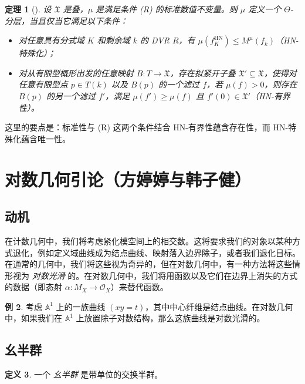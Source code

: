 \documentclass{amsart}
\newtheorem{thm}{定理}[section]
\theoremstyle{definition}
\newtheorem{defn}[thm]{定义}
\newtheorem{exm}[thm]{例}
\theoremstyle{remark}
\theoremstyle{plain}
\theoremstyle{definition}
\theoremstyle{remark}
\newcommand{\A}{\mathbb{A}}
\newcommand{\mc}[1]{\mathcal{#1}}
\newcommand{\mf}[1]{\mathfrak{#1}}
\newcommand{\mr}[1]{\mathrm{#1}}
\newcommand{\1}{\mathbf{1}}
\newcommand{\2}{\mathbf{2}}
\newcommand{\3}{\mathbf{3}}
\begin{document}
\begin{thm}[{\cite{HLinstability}}]
    设 \(\mf{X}\) 是叠，\(\mu\) 是满足条件 (R) 的标准数值不变量。则 \(\mu\) 定义一个 \(\Theta\)-分层，当且仅当它满足以下条件：
    \begin{itemize}
        \item 对任意具有分式域 \(K\) 和剩余域 \(k\) 的 DVR \(R\)，有 \(\mu(f_K^{\mr{HN}}) \leq M^{\mu}(f_k)\)（HN-特殊化）；
        \item 对从有限型概形出发的任意映射 \(B \colon T \to \mf{X}\)，存在拟紧开子叠 \(\mf{X}' \subseteq \mf{X}\)，使得对任意有限型点 \(p \in T(k)\) 以及 \(B(p)\) 的一个滤过 \(f\)，若 \(\mu(f) > 0\)，则存在 \(B(p)\) 的另一个滤过 \(f'\)，满足 \(\mu(f') \geq \mu(f)\) 且 \(f'(0) \in \mf{X}'\)（HN-有界性）。
    \end{itemize}
\end{thm}

这里的要点是：标准性与 (R) 这两个条件结合 HN-有界性蕴含存在性，而 HN-特殊化蕴含唯一性。
\section{对数几何引论（方婷婷与韩子健）}%
\label{sec:Intro to log geometry (Tingting Fang and Zijian Han)}

\subsection{动机}%
\label{sub:Motivation}

在计数几何中，我们将考虑紧化模空间上的相交数。这将要求我们的对象以某种方式退化，例如定义域曲线成为结点曲线、映射落入边界除子，或者我们退化目标。在通常的几何中，我们将这些视为奇异的，但在对数几何中，有一种方法将这些情形视为 \textit{对数光滑} 的。在对数几何中，我们将用函数以及它们在边界上消失的方式的数据（即态射 \(\alpha \colon M_X \to \mc{O}_X\)）来替代函数。

\begin{exm}
    考虑 \(\A^1\) 上的一族曲线 \((xy=t)\)，其中中心纤维是结点曲线。在对数几何中，如果我们在 \(\A^1\) 上放置除子对数结构，那么这族曲线是对数光滑的。
\end{exm}

\subsection{幺半群}%
\label{sub:Monoids}

\begin{defn}
    一个 \textit{幺半群} 是带单位的交换半群。
\end{defn}
\end{document}
